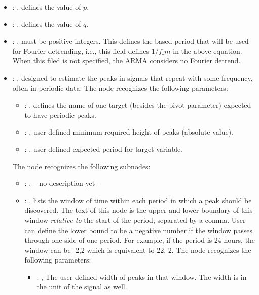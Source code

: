 \begin{itemize}
    \item {}: , 
      defines the value of $p$.

    \item {}: , 
      defines the value of $q$.

    \item {}: , 
      must be positive integers. This defines the
      based period that will be used for Fourier detrending, i.e., this
      field defines $1/f\_m$ in the above equation.
      When this filed is not specified, the ARMA considers no Fourier detrend.

    \item {}: , 
      designed to estimate the peaks in signals that repeat with some frequency,
      often in periodic data.
      The  node recognizes the following parameters:
        \begin{itemize}
          \item {}: , 
            defines the name of one target (besides the                         pivot parameter)
            expected to have periodic peaks.
          \item {}: , 
            user-defined minimum required                         height of peaks (absolute value).
          \item {}: , 
            user-defined expected period for target variable.
      \end{itemize}

      The  node recognizes the following subnodes:
      \begin{itemize}
        \item {}: , 
          -- no description yet --

        \item {}: , 
          lists the window of time within each period in which a peak should be discovered.
          The text of this node is the upper and lower boundary of this
          window \emph{relative to} the start of the period, separated by a comma.
          User can define the lower bound to be a negative
          number if the window passes through one side of one period. For example, if the period is
          24                                                  hours, the window can be -2,2 which is
          equivalent to 22, 2.
          The  node recognizes the following parameters:
            \begin{itemize}
              \item {}: , 
                The user defined  width of peaks in that window. The width is in the unit of the
                signal as well.
          \end{itemize}
      \end{itemize}


\end{itemize}
